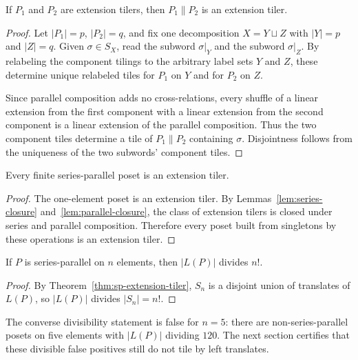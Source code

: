 \begin{lemma}
\label{lem:parallel-closure}
If $P_1$ and $P_2$ are extension tilers, then $P_1\|P_2$ is an extension
tiler.
\end{lemma}

\begin{proof}
Let $|P_1|=p$, $|P_2|=q$, and fix one decomposition
$X=Y\sqcup Z$ with $|Y|=p$ and $|Z|=q$.  Given
$\sigma\in S_X$, read the subword $\sigma|_Y$ and the subword
$\sigma|_Z$.  By relabeling the component tilings to the arbitrary label
sets $Y$ and $Z$, these determine unique relabeled tiles for $P_1$ on
$Y$ and for $P_2$ on $Z$.

Since parallel composition adds no cross-relations, every shuffle of a
linear extension from the first component with a linear extension from
the second component is a linear extension of the parallel composition.
Thus the two component tiles determine a tile of $P_1\|P_2$ containing
$\sigma$.  Disjointness follows from the uniqueness of the two subwords'
component tiles.
\end{proof}

\begin{theorem}
\label{thm:sp-extension-tiler}
Every finite series-parallel poset is an extension tiler.
\end{theorem}

\begin{proof}
The one-element poset is an extension tiler.  By
Lemmas~\ref{lem:series-closure} and~\ref{lem:parallel-closure}, the class of extension
tilers is closed under series and parallel composition.  Therefore every
poset built from singletons by these operations is an extension tiler.
\end{proof}

\begin{corollary}
If $P$ is series-parallel on $n$ elements, then $|L(P)|$ divides $n!$.
\end{corollary}

\begin{proof}
By Theorem~\ref{thm:sp-extension-tiler}, $S_n$ is a disjoint union of
translates of $L(P)$, so $|L(P)|$ divides $|S_n|=n!$.
\end{proof}

\begin{remark}
The converse divisibility statement is false for $n=5$: there are
non-series-parallel posets on five elements with $|L(P)|$ dividing
$120$.  The next section certifies that these divisible false positives
still do not tile by left translates.
\end{remark}

